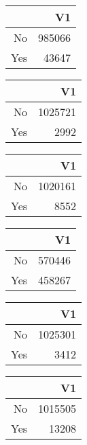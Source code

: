 \bigskip\bigskip
\centering
\begin{tabular}{rr}
  \hline
 & V1 \\ 
  \hline
No & 985066 \\ 
  Yes & 43647 \\ 
   \hline
\end{tabular}

\bigskip\bigskip
\centering
\begin{tabular}{rr}
  \hline
 & V1 \\ 
  \hline
No & 1025721 \\ 
  Yes & 2992 \\ 
   \hline
\end{tabular}

\bigskip\bigskip
\centering
\begin{tabular}{rr}
  \hline
 & V1 \\ 
  \hline
No & 1020161 \\ 
  Yes & 8552 \\ 
   \hline
\end{tabular}

\bigskip\bigskip
\centering
\begin{tabular}{rr}
  \hline
 & V1 \\ 
  \hline
No & 570446 \\ 
  Yes & 458267 \\ 
   \hline
\end{tabular}

\bigskip\bigskip
\centering
\begin{tabular}{rr}
  \hline
 & V1 \\ 
  \hline
No & 1025301 \\ 
  Yes & 3412 \\ 
   \hline
\end{tabular}

\bigskip\bigskip
\centering
\begin{tabular}{rr}
  \hline
 & V1 \\ 
  \hline
No & 1015505 \\ 
  Yes & 13208 \\ 
   \hline
\end{tabular}

